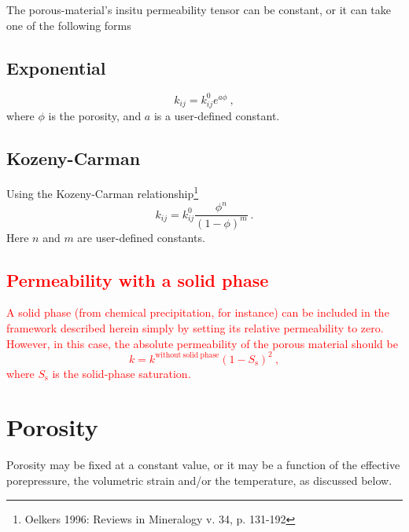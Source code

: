 \documentclass[12pt]{report}
\begin{document}
The porous-material's insitu permeability tensor can be constant, or
it can take one of the following forms

\subsection{Exponential}

\begin{equation}
k_{ij} = k_{ij}^{0} e^{a\phi} \ ,
\end{equation}
where $\phi$ is the porosity, and $a$ is a user-defined constant.

\subsection{Kozeny-Carman}

Using the Kozeny-Carman relationship\footnote{Oelkers
1996: Reviews in Mineralogy v. 34, p. 131-192}
\begin{equation}
k_{ij} = k_{ij}^{0} \frac{\phi^{n}}{(1 - \phi)^{m}} \ .
\end{equation}
Here $n$ and $m$ are user-defined constants.

\subsection{\textcolor{red}{Permeability with a solid phase}}

\textcolor{red}{
A solid phase (from chemical precipitation, for instance) can be
included in the framework described herein simply by setting its
relative permeability to zero.  However, in this case, the absolute
permeability of the porous material should be
\begin{equation}
k = k^{\mathrm{without\ solid\ phase}}(1 - S_{\mathrm{s}})^{2} \ ,
\end{equation}
where $S_{\mathrm{s}}$ is the solid-phase saturation.
}

\section{Porosity}
\label{por.sec}

Porosity may be fixed at a constant value, or it may be a function of
the effective porepressure, the volumetric strain and/or the
temperature, as discussed below.
\end{document}
